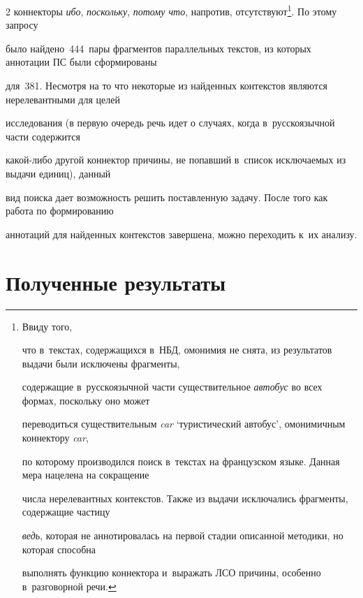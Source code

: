 \begin{multicols}{2}
коннекторы \textit{ибо}, \textit{поскольку}, \textit{потому что}, напротив, отсутствуют\footnote{Ввиду того, 


что в~текстах, содержащихся в~НБД, омонимия не снята, из результатов выдачи были исключены фрагменты, 


содержащие в~русскоязычной части существительное \textit{автобус} во всех формах, поскольку оно может 


переводиться существительным \textit{car} `туристический автобус', омонимичным коннектору \textit{car}, 


по которому производился поиск в~текстах на французском языке. Данная мера нацелена на сокращение 


числа нерелевантных контекстов. Также из выдачи исключались фрагменты, содержащие частицу 


\textit{ведь}, которая не аннотировалась на первой стадии описанной методики, но которая способна 


выполнять функцию коннектора и~выражать ЛСО причины, особенно в~разговорной речи.}. По этому запросу 


было найдено~444~пары фрагментов параллельных текстов, из которых аннотации ПС были сформированы 


для~381. Несмотря на то что некоторые из найденных контекстов являются нерелевантными для целей 


исследования (в первую очередь речь идет о случаях, когда в~русскоязычной части содержится  


ка\-кой-ли\-бо другой коннектор причины, не попавший в~список исключаемых из выдачи единиц), данный 


вид поиска дает возможность решить поставленную задачу. После того как работа по формированию 


аннотаций для найденных контекстов завершена, можно переходить к~их анализу.





\vspace*{-6pt}





\section{Полученные результаты}





\vspace*{-4pt}






\end{multicols}
